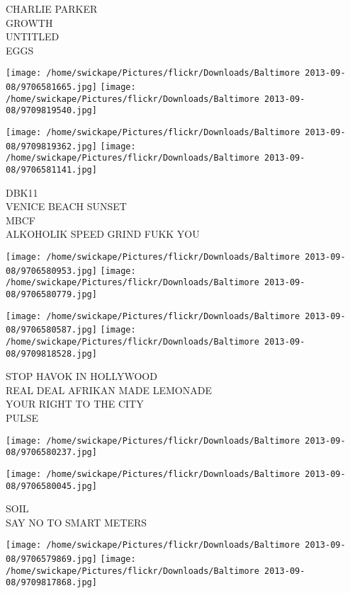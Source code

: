 \documentclass[10pt,letterpaper]{article}
\begin{document}
CHARLIE PARKER\\
GROWTH\\
UNTITLED\\
EGGS\\
\pagebreak

\texttt{[image: /home/swickape/Pictures/flickr/Downloads/Baltimore 2013-09-08/9706581665.jpg]}
\texttt{[image: /home/swickape/Pictures/flickr/Downloads/Baltimore 2013-09-08/9709819540.jpg]}

\texttt{[image: /home/swickape/Pictures/flickr/Downloads/Baltimore 2013-09-08/9709819362.jpg]}
\texttt{[image: /home/swickape/Pictures/flickr/Downloads/Baltimore 2013-09-08/9706581141.jpg]}

DBK11\\
VENICE BEACH SUNSET\\
MBCF\\
ALKOHOLIK SPEED GRIND FUKK YOU\\
\pagebreak

\texttt{[image: /home/swickape/Pictures/flickr/Downloads/Baltimore 2013-09-08/9706580953.jpg]}
\texttt{[image: /home/swickape/Pictures/flickr/Downloads/Baltimore 2013-09-08/9706580779.jpg]}

\texttt{[image: /home/swickape/Pictures/flickr/Downloads/Baltimore 2013-09-08/9706580587.jpg]}
\texttt{[image: /home/swickape/Pictures/flickr/Downloads/Baltimore 2013-09-08/9709818528.jpg]}

STOP HAVOK IN HOLLYWOOD\\
REAL DEAL AFRIKAN MADE LEMONADE\\
YOUR RIGHT TO THE CITY\\
PULSE\\
\pagebreak

\texttt{[image: /home/swickape/Pictures/flickr/Downloads/Baltimore 2013-09-08/9706580237.jpg]}

\vspace{0.25in}
\texttt{[image: /home/swickape/Pictures/flickr/Downloads/Baltimore 2013-09-08/9706580045.jpg]}

SOIL\\
SAY NO TO SMART METERS\\
\pagebreak

\texttt{[image: /home/swickape/Pictures/flickr/Downloads/Baltimore 2013-09-08/9706579869.jpg]}
\texttt{[image: /home/swickape/Pictures/flickr/Downloads/Baltimore 2013-09-08/9709817868.jpg]}
\end{document}
